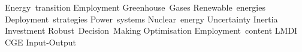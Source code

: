 \noindent Energy~transition \quad 
Employment \quad
Greenhouse~Gases \quad
Renewable~energies \quad
Deployment~strategies \quad
Power~systems \quad
Nuclear~energy \quad
Uncertainty \quad
Inertia \quad
Investment \quad
Robust~Decision~Making \quad
Optimisation \quad
Employment~content \quad
LMDI \quad
CGE \quad
Input-Output \quad